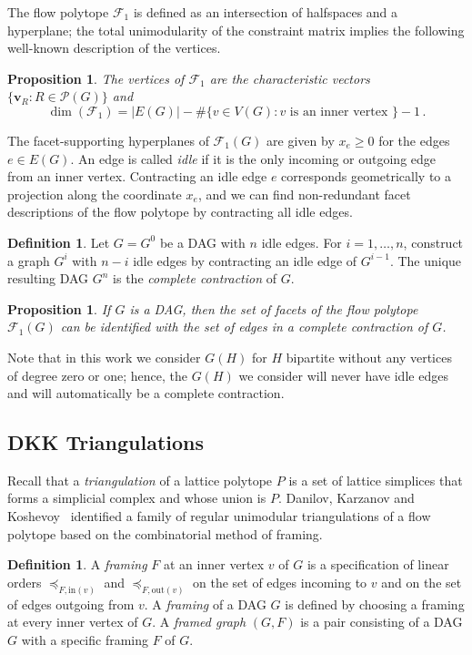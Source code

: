 \documentclass[12pt]{amsart}
\newtheorem{proposition}[theorem]{Proposition}
\theoremstyle{definition}
\newtheorem{definition}[theorem]{Definition}
\newcommand\bv{\mathbf{v}}
\newcommand\calF{\mathcal{F}}
\newcommand\calP{\mathcal{P}}
\newcommand\inedge{\mathrm{in}}
\newcommand\outedge{\mathrm{out}}
\begin{document}
The flow polytope $\calF_1$ is defined as an intersection of halfspaces and a hyperplane; the total unimodularity of the constraint matrix implies the following well-known description of the vertices.

\begin{proposition}\label{prop:flowbasics}
The vertices of $\calF_1$ are the characteristic vectors $\{\bv_R: R\in \calP(G)\}$ and 
\[
\dim( \mathcal{F}_1) = |E(G)| - \#\{v \in V(G) : v \text{ is an inner vertex } \} -1 \, .
\]
\end{proposition}

The facet-supporting hyperplanes of $\calF_1(G)$ are given by $x_e\geq 0$ for the edges $e\in E(G)$.
An edge is called \emph{idle} if it is the only incoming or outgoing edge from an inner vertex. 
Contracting an idle edge $e$ corresponds geometrically to a projection along the coordinate $x_e$, and we can find non-redundant facet descriptions of the flow polytope by contracting all idle edges.

\begin{definition}\label{def:reductiontofull}
Let $G = G^0$ be a DAG with $n$ idle edges. 
For $i=1,\dots,n$, construct a graph $G^i$ with $n-i$ idle edges by contracting an idle edge of $G^{i-1}$.
The unique resulting DAG $G^n$ is the \emph{complete contraction} of $G$.
\end{definition}

\begin{proposition}\label{prop:contractidle}
If $G$ is a DAG, then the set of facets of the flow polytope $\calF_1(G)$ can be identified with the set of edges in a complete contraction of $G$.
\end{proposition}

Note that in this work we consider $G(H)$ for $H$ bipartite without any vertices of degree zero or one; hence, the $G(H)$ we consider will never have idle edges and will automatically be a complete contraction.


\subsection{DKK Triangulations}
Recall that a \emph{triangulation} of a lattice polytope $P$ is a set of lattice simplices that forms a simplicial complex and whose union is $P$.
Danilov, Karzanov and Koshevoy~\cite{DKK12} identified a family of regular unimodular triangulations of a flow polytope based on the combinatorial method of framing.

\begin{definition}
A \emph{framing} $F$ at an inner vertex $v$ of $G$ is a specification of linear orders $\preceq_{F,\inedge(v)}$ and $\preceq_{F,\outedge(v)}$ on the set of edges incoming to $v$ and on the set of edges outgoing from $v$.  
A \emph{framing} of a DAG $G$ is defined by choosing a framing at every inner vertex of $G$.
A \emph{framed graph} $(G,F)$ is a pair consisting of a DAG $G$ with a specific framing $F$ of $G$.
\end{definition}
\end{document}

